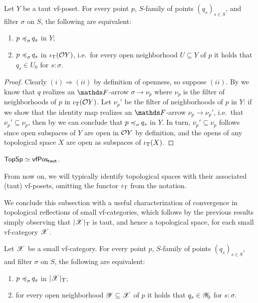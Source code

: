 \begin{prop}\label{prop:taut-vf-posets-come-from-spaces}
    Let $Y$ be a taut vf-poset. For every point $p$, $S$-family of points $(q_s)_{s\in S}$, and filter $\sigma$ on $S$, the following are equivalent:
    \begin{enumerate}
        \item $p \mathrel{\preccurlyeq_{{\sigma}}^{{}}\mkern-2mu} q_s$ in $Y$;
        \item $p \mathrel{\preccurlyeq_{{\sigma}}^{{}}\mkern-2mu} q_s$ in $\iota_\mathrm{T}( \mathcal{O}  Y)$, i.e.\ for every open neighborhood $U \subseteq Y$ of $p$ it holds that $q_s \in U_0$ for $s:\sigma$.
    \end{enumerate}
\begin{proof}
    Clearly $(i)\Rightarrow(ii)$ by definition of openness, so suppose $(ii)$. By  we know that $q$ realizes an $\FF$-arrow $\sigma \to \nu_p$ where $\nu_p$ is the filter of neighborhoods of $p$ in $\iota_\mathrm{T}(\mathcal{O} Y)$. Let $\nu_p'$ be the filter of neighborhoods of $p$ in $Y$: if we show that the identity map realizes an $\FF$-arrow $\nu_p \to \nu_p'$, i.e.\ that $\nu_p' \subseteq \nu_p$, then by  we can conclude that $p \mathrel{\preccurlyeq_{{\sigma}}^{{}}\mkern-2mu} q_s$ in $Y$. In turn, $\nu_p' \subseteq \nu_p$ follows since  open subspaces of $Y$ are open in $\mathcal{O} Y$ by definition, and the opens of any topological space $X$ are open as subspaces of $\iota_\mathrm{T} (X)$.
\end{proof}
\end{prop}

\begin{cor}
    $\mathsf{TopSp} \simeq \mathsf{vfPos_{taut}}$.
\end{cor}

\begin{rmk}
    From now on, we will typically identify topological spaces with their associated (taut) vf-posets, omitting the functor $\iota_\mathrm{T}$ from the notation.
\end{rmk}

We conclude this subsection with a useful characterization of convergence in topological reflections of small vf-categories, which follows by the previous results simply observing that $|\mathscr{X}|_\mathrm{T}$ is taut, and hence a topological space, for each small vf-category $\mathscr{X}$.

\begin{cor}\label{prop:convergence-in-topological-reflection-is-witnessed}
    Let $\mathscr{X}$ be a small vf-category. For every point $p$, $S$-family of points $(q_s)_{s\in S}$, and filter $\sigma$ on $S$, the following are equivalent:
    \begin{enumerate}
        \item $p \mathrel{\preccurlyeq_{{\sigma}}^{{}}\mkern-2mu} q_s$ in $|\mathscr{X}|_\mathrm{T}$;
        \item for every open neighborhood $\mathscr{Y} \subseteq \mathscr{X}$ of $p$ it holds that $q_s \in \mathscr{Y}_0$ for $s:\sigma$.
    \end{enumerate}
\end{cor}


